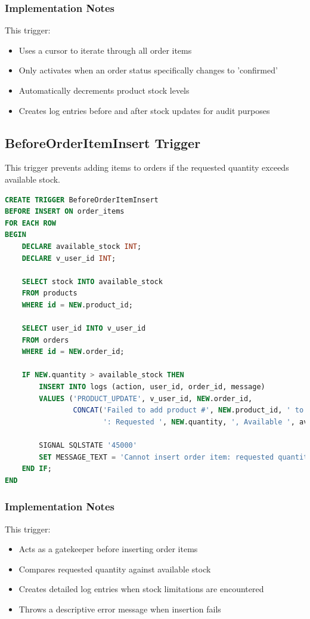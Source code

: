 \documentclass[13pt,a4paper]{article}
\begin{document}
\subsubsection{Implementation Notes}
This trigger:
\begin{itemize}
	\item Uses a cursor to iterate through all order items
	\item Only activates when an order status specifically changes to 'confirmed'
	\item Automatically decrements product stock levels
	\item Creates log entries before and after stock updates for audit purposes
\end{itemize}

\subsection{BeforeOrderItemInsert Trigger}
This trigger prevents adding items to orders if the requested quantity exceeds available stock.

\begin{lstlisting}[language=SQL]
CREATE TRIGGER BeforeOrderItemInsert
BEFORE INSERT ON order_items
FOR EACH ROW
BEGIN
    DECLARE available_stock INT;
    DECLARE v_user_id INT;
    
    SELECT stock INTO available_stock
    FROM products
    WHERE id = NEW.product_id;
    
    SELECT user_id INTO v_user_id
    FROM orders
    WHERE id = NEW.order_id;

    IF NEW.quantity > available_stock THEN
        INSERT INTO logs (action, user_id, order_id, message)
        VALUES ('PRODUCT_UPDATE', v_user_id, NEW.order_id, 
                CONCAT('Failed to add product #', NEW.product_id, ' to order #', NEW.order_id, 
                       ': Requested ', NEW.quantity, ', Available ', available_stock));
                
        SIGNAL SQLSTATE '45000'
        SET MESSAGE_TEXT = 'Cannot insert order item: requested quantity exceeds available stock';
    END IF;
END
\end{lstlisting}

\subsubsection{Implementation Notes}
This trigger:
\begin{itemize}
	\item Acts as a gatekeeper before inserting order items
	\item Compares requested quantity against available stock
	\item Creates detailed log entries when stock limitations are encountered
	\item Throws a descriptive error message when insertion fails
\end{itemize}
\end{document}
